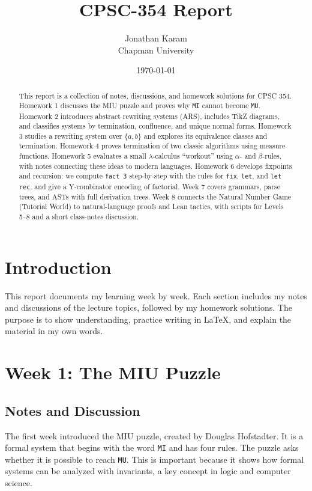 \documentclass{article}
\title{CPSC-354 Report}
\author{Jonathan Karam \\ Chapman University}
\date{\today}
\theoremstyle{theorem}
\theoremstyle{definition}
\theoremstyle{remark}
\begin{document}
\maketitle

\begin{abstract}
This report is a collection of notes, discussions, and homework solutions for CPSC 354. 
Homework 1 discusses the MIU puzzle and proves why \texttt{MI} cannot become \texttt{MU}. 
Homework 2 introduces abstract rewriting systems (ARS), includes TikZ diagrams, and classifies systems by termination, confluence, and unique normal forms. 
Homework 3 studies a rewriting system over $\{a,b\}$ and explores its equivalence classes and termination.
Homework 4 proves termination of two classic algorithms using measure functions.
Homework 5 evaluates a small $\lambda$-calculus ``workout'' using $\alpha$- and $\beta$-rules, with notes connecting these ideas to modern languages.
Homework 6 develops fixpoints and recursion: we compute \texttt{fact 3} step-by-step with the rules for \texttt{fix}, \texttt{let}, and \texttt{let rec}, and give a Y-combinator encoding of factorial.
Week 7 covers grammars, parse trees, and ASTs with full derivation trees.
Week 8 connects the Natural Number Game (Tutorial World) to natural-language proofs and Lean tactics, with scripts for Levels 5--8 and a short class-notes discussion.
\end{abstract}

\tableofcontents

\section{Introduction}
This report documents my learning week by week. 
Each section includes my notes and discussions of the lecture topics, followed by my homework solutions.
The purpose is to show understanding, practice writing in \LaTeX{}, and explain the material in my own words.

\section{Week 1: The MIU Puzzle}

\subsection{Notes and Discussion}
The first week introduced the MIU puzzle, created by Douglas Hofstadter. 
It is a formal system that begins with the word \texttt{MI} and has four rules. 
The puzzle asks whether it is possible to reach \texttt{MU}. 
This is important because it shows how formal systems can be analyzed with invariants, a key concept in logic and computer science.
\end{document}
